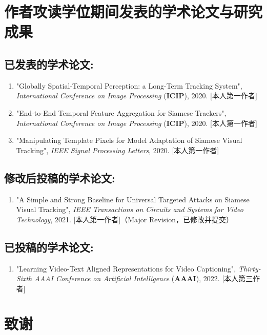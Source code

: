 \chapter{作者攻读学位期间发表的学术论文与研究成果}


\section*{已发表的学术论文:}

{
\setlist[enumerate]{}%
\begin{enumerate}[nosep]
    \item "Globally Spatial-Temporal Perception: a Long-Term Tracking System", \textit{International Conference on Image Processing} (\textbf{ICIP}), 2020. [本人第一作者]
    \item "End-to-End Temporal Feature Aggregation for Siamese Trackers", \textit{International Conference on Image Processing} (\textbf{ICIP}), 2020. [本人第一作者]
    \item "Manipulating Template Pixels for Model Adaptation of Siamese Visual Tracking", \textit{IEEE Signal Processing Letters}, 2020. [本人第一作者]
\end{enumerate}
}

\section*{修改后投稿的学术论文:}
{
\setlist[enumerate]{}%
\begin{enumerate}[nosep]
    \item "A Simple and Strong Baseline for Universal Targeted Attacks on Siamese Visual Tracking", \textit{IEEE Transactions on Circuits and Systems for Video Technology}, 2021. [本人第一作者]（Major Revision，已修改并提交）
\end{enumerate}
}

\section*{已投稿的学术论文:}

{
\setlist[enumerate]{}%
\begin{enumerate}[nosep]
    \item "Learning Video-Text Aligned Representations for Video Captioning", \textit{Thirty-Sixth AAAI Conference on Artificial Intelligence} (\textbf{AAAI}), 2022. [本人第三作者]
\end{enumerate}
}

\chapter[致谢]{致\quad 谢}%
\thispagestyle{noheaderstyle}%

\cleardoublepage[plain]%

